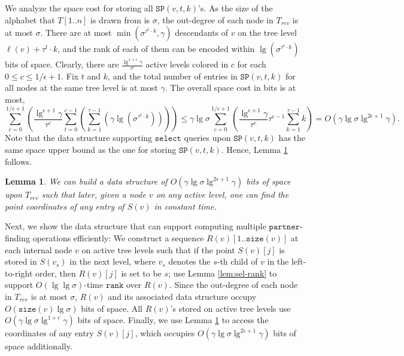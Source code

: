 \documentclass[smallabstract,smallcaptions]{dccpaper}
\newtheorem{lemma}{Lemma}
\def\idtt#1{\ensuremath{\mathtt{#1}}}
\def\partner{\idtt{partner}}
\def\rank{\idtt{rank}}
\def\size{\idtt{size}}
\def\select{\idtt{select}}
\def\sp{\idtt{SP}}
\begin{document}
We analyze the space cost for storing all $\sp(v, t, k)$'s. 
As the size of the alphabet that $T[1..n]$ is drawn from is $\sigma$, the out-degree of each node in $T_{rev}$ is at most $\sigma$.
There are at most $\min(\sigma^{\tau^{t}\cdot k}, \gamma)$ descendants of $v$ on the tree level $\ell(v)+ \tau^{t}\cdot k$, and the rank of each of them can be encoded within $\lg (\sigma^{\tau^{t}\cdot k})$ bits of space.
Clearly, there are $\frac{\lg^{1+\epsilon} \gamma}{\tau^c}$ active levels colored in $c$ for each $0\le c \le 1/\epsilon+1$.
Fix $t$ and $k$, and the total number of entries in $\sp(v,t, k)$ for all nodes at the same tree level is at most $\gamma$.
The overall space cost in bits is at most,
$$\sum_{c=0}^{1/\epsilon+1} (\frac{\lg^{\epsilon+1} \gamma}{\tau^c} \sum_{t=0}^{c-1} (\sum_{k=1}^{\tau-1} (\gamma\lg (\sigma^{\tau^{t}\cdot k}))))\leq \gamma\lg \sigma\sum_{c=0}^{1/\epsilon+1} (\frac{\lg^{\epsilon+1} \gamma}{\tau^c} \tau^{c-1}\sum_{k=1}^{\tau-1} k)=O(\gamma \lg \sigma\lg^{2\epsilon+1} \gamma).$$
Note that the data structure supporting $\select$ queries upon $\sp(v, t, k)$ has the same space upper bound as the one for storing $\sp(v, t, k)$.
Hence, Lemma \ref{lem:ball_rev} follows.

\begin{lemma}
	\label{lem:ball_rev}
	We can build a data structure of $O(\gamma \lg \sigma\lg^{2\epsilon+1} \gamma)$ bits of space upon $T_{rev}$ such that later, given a node $v$ on any active level, one can find the point coordinates of any entry of $S(v)$ in constant time.
\end{lemma}

Next, we show the data structure that can support computing multiple $\partner$-finding operations efficiently:
We construct a sequence $R(v)[1..\size(v)]$ at each internal node $v$ on active tree levels such that if the point $S(v)[j]$ is stored in $S(v_s)$ in the next level, where $v_s$ denotes the $s$-th child of $v$ in the left-to-right order, then $R(v)[j]$ is set to be $s$; use Lemma \ref{lem:sel-rank} to support $O(\lg \lg \sigma)$-time $\rank$ over $R(v)$.
Since the out-degree of each node in $T_{rev}$ is at most $\sigma$, $R(v)$ and its associated data structure occupy $O(\size(v)\lg \sigma)$ bits of space.
All $R(v)$'s stored on active tree levels use $O(\gamma \lg \sigma \lg^{1+\epsilon} \gamma)$ bits of space.
Finally, we use Lemma \ref{lem:ball_rev} to access the coordinates of any entry $S(v)[j]$, which occupies $O(\gamma \lg \sigma\lg^{2\epsilon+1} \gamma)$ bits of space additionally.
\end{document}
